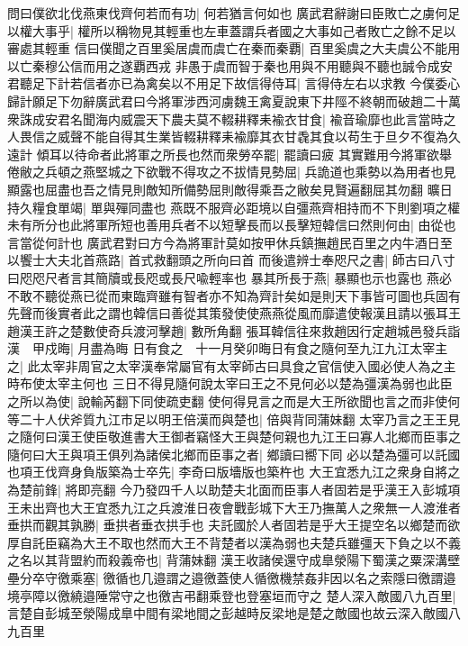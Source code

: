 問曰僕欲北伐燕東伐齊何若而有功|{
	何若猶言何如也}
廣武君辭謝曰臣敗亡之虜何足以權大事乎|{
	權所以稱物見其輕重也左車蓋謂兵者國之大事如己者敗亡之餘不足以審處其輕重}
信曰僕聞之百里奚居虞而虞亡在秦而秦覇|{
	百里奚虞之大夫虞公不能用以亡秦穆公信而用之遂覇西戎}
非愚于虞而智于秦也用與不用聽與不聽也誠令成安君聽足下計若信者亦已為禽矣以不用足下故信得侍耳|{
	言得侍左右以求教}
今僕委心歸計願足下勿辭廣武君曰今將軍涉西河虜魏王禽夏說東下井陘不終朝而破趙二十萬衆誅成安君名聞海内威震天下農夫莫不輟耕釋耒褕衣甘食|{
	褕音瑜靡也此言當時之人畏信之威聲不能自得其生業皆輟耕釋耒褕靡其衣甘毳其食以苟生于旦夕不復為久遠計}
傾耳以待命者此將軍之所長也然而衆勞卒罷|{
	罷讀曰疲}
其實難用今將軍欲舉倦敝之兵頓之燕堅城之下欲戰不得攻之不拔情見勢屈|{
	兵詭道也乘勢以為用者也見顯露也屈盡也吾之情見則敵知所備勢屈則敵得乘吾之敝矣見賢遍翻屈其勿翻}
曠日持久糧食單竭|{
	單與殫同盡也}
燕既不服齊必距境以自彊燕齊相持而不下則劉項之權未有所分也此將軍所短也善用兵者不以短擊長而以長擊短韓信曰然則何由|{
	由從也言當從何計也}
廣武君對曰方今為將軍計莫如按甲休兵鎮撫趙民百里之内牛酒日至以饗士大夫北首燕路|{
	首式救翻頭之所向曰首}
而後遣辨士奉咫尺之書|{
	師古曰八寸曰咫咫尺者言其簡牘或長咫或長尺喩輕率也}
暴其所長于燕|{
	暴顯也示也露也}
燕必不敢不聽從燕已從而東臨齊雖有智者亦不知為齊計矣如是則天下事皆可圖也兵固有先聲而後實者此之謂也韓信曰善從其策發使使燕燕從風而靡遣使報漢且請以張耳王趙漢王許之楚數使奇兵渡河擊趙|{
	數所角翻}
張耳韓信往來救趙因行定趙城邑發兵詣漢　甲戍晦|{
	月盡為晦}
日有食之　十一月癸卯晦日有食之隨何至九江九江太宰主之|{
	此太宰非周官之太宰漢奉常屬官有太宰師古曰具食之官信使入國必使人為之主時布使太宰主何也}
三日不得見隨何說太宰曰王之不見何必以楚為彊漢為弱也此臣之所以為使|{
	說輸芮翻下同使疏吏翻}
使何得見言之而是大王所欲聞也言之而非使何等二十人伏斧質九江市足以明王倍漢而與楚也|{
	倍與背同蒲妹翻}
太宰乃言之王王見之隨何曰漢王使臣敬進書大王御者竊怪大王與楚何親也九江王曰寡人北鄉而臣事之隨何曰大王與項王俱列為諸侯北鄉而臣事之者|{
	鄉讀曰嚮下同}
必以楚為彊可以託國也項王伐齊身負版築為士卒先|{
	李奇曰版墻版也築杵也}
大王宜悉九江之衆身自將之為楚前鋒|{
	將即亮翻}
今乃發四千人以助楚夫北面而臣事人者固若是乎漢王入彭城項王未出齊也大王宜悉九江之兵渡淮日夜會戰彭城下大王乃撫萬人之衆無一人渡淮者垂拱而觀其孰勝|{
	垂拱者垂衣拱手也}
夫託國於人者固若是乎大王提空名以鄉楚而欲厚自託臣竊為大王不取也然而大王不背楚者以漢為弱也夫楚兵雖彊天下負之以不義之名以其背盟約而殺義帝也|{
	背蒲妹翻}
漢王收諸侯還守成臯滎陽下蜀漢之粟深溝壁壘分卒守徼乘塞|{
	徼循也几邉謂之邉徼蓋使人循徼機禁姦非因以名之索隱曰徼謂邉境亭障以徼繞邉陲常守之也徼吉弔翻乘登也登塞垣而守之}
楚人深入敵國八九百里|{
	言楚自彭城至滎陽成臯中間有梁地間之彭越時反梁地是楚之敵國也故云深入敵國八九百里}
